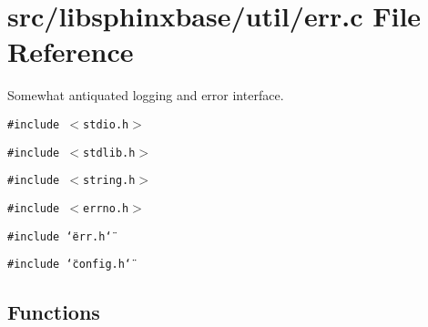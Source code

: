 \section{src/libsphinxbase/util/err.c File Reference}
\label{err_8c}
Somewhat antiquated logging and error interface.  


{\tt \#include $<$stdio.h$>$}\par
{\tt \#include $<$stdlib.h$>$}\par
{\tt \#include $<$string.h$>$}\par
{\tt \#include $<$errno.h$>$}\par
{\tt \#include \char`\"{}err.h\char`\"{}}\par
{\tt \#include \char`\"{}config.h\char`\"{}}\par
\subsection*{Functions}
